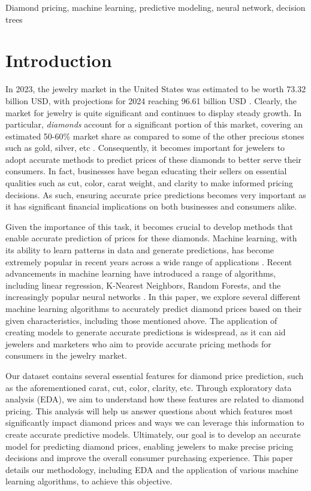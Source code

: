 \documentclass[conference]{IEEEtran}
\begin{document}
\begin{IEEEkeywords}
Diamond pricing, machine learning, predictive modeling, neural network, decision trees
\end{IEEEkeywords}

\section{Introduction}

In 2023, the jewelry market in the United States was estimated to be worth 73.32 billion USD, with projections for 2024 reaching 96.61 billion USD \cite{us}. Clearly, the market for jewelry is quite significant and continues to display steady growth. In particular, \emph{diamonds} account for a significant portion of this market, covering an estimated 50-60\% market share as compared to some of the other precious stones such as gold, silver, etc \cite{diamond}. Consequently, it becomes important for jewelers to adopt accurate methods to predict prices of these diamonds to better serve their consumers. In fact, businesses have began educating their sellers on essential qualities such as cut, color, carat weight, and clarity to make informed pricing decisions. As such, ensuring accurate price predictions becomes very important as it has significant financial implications on both businesses and consumers alike.

Given the importance of this task, it becomes crucial to develop methods that enable accurate prediction of prices for these diamonds. Machine learning, with its ability to learn patterns in data and generate predictions, has become extremely popular in recent years across a wide range of applications \cite{kino}. Recent advancements in machine learning have introduced a range of algorithms, including linear regression, K-Nearest Neighbors, Random Forests, and the increasingly popular neural networks \cite{sarker}. In this paper, we explore several different machine learning algorithms to accurately predict diamond prices based on their given characteristics, including those mentioned above. The application of creating models to generate accurate predictions is widespread, as it can aid jewelers and marketers who aim to provide accurate pricing methods for consumers in the jewelry market.

Our dataset contains several essential features for diamond price prediction, such as the aforementioned carat, cut, color, clarity, etc. \cite{kaggle} Through exploratory data analysis (EDA), we aim to understand how these features are related to diamond pricing. This analysis will help us answer questions about which features most significantly impact diamond prices and ways we can leverage this information to create accurate predictive models. Ultimately, our goal is to develop an accurate model for predicting diamond prices, enabling jewelers to make precise pricing decisions and improve the overall consumer purchasing experience. This paper details our methodology, including EDA and the application of various machine learning algorithms, to achieve this objective.
\end{document}
